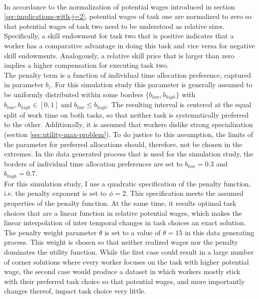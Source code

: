 \documentclass[../main.tex]{subfiles}
\begin{document}
\\
In accordance to the normalization of potential wages introduced in section \ref{sec:implications-with-j=2}, potential wages of task one are normalized to zero so that potential wages of task two need to be understood as relative sizes. Specifically, a skill endowment for task two that is positive indicates that a worker has a comparative advantage in doing this task and vice versa for negative skill endowments. Analogously, a relative skill price that is larger than zero implies a higher compensation for executing task two.
\\
The penalty term is a function of individual time allocation preference, captured in parameter $b_i$. For this simulation study this parameter is generally assumed to be uniformly distributed within some borders $\{b_{low}, b_{high}\}$ with $b_{low}, b_{high} \in [0, 1] \; \text{and} \; b_{low} \leq b_{high}$. The resulting interval is centered at the equal split of work time on both tasks, so that neither task is systematically preferred to the other. Additionally, it is assumed that workers dislike strong specialization (section \ref{sec:utility-max-problem}). To do justice to this assumption, the limits of the parameter for preferred allocations should, therefore, not be chosen in the extremes. In the data generated process that is used for the simulation study, the borders of individual time allocation preferences are set to $b_{low} = 0.3$ and $b_{high} = 0.7$.
\\
For this simulation study, I use a quadratic specification of the penalty function, i.e. the penalty exponent is set to $\phi = 2$. This specification meets  the assumed properties of the penalty function. 
At the same time, it results optimal task choices that are a linear function in relative potential wages, which makes the linear interpolation of inter temporal changes in task choices an exact solution. The penalty weight parameter $\theta$ is set to a value of $\theta = 15$ in this data generating process. This weight is chosen so that neither realized wages nor the penalty dominates the utility function.
While the first case could result in a large number of corner solutions where every worker focuses on the task with higher potential wage, the second case would produce a dataset in which workers mostly stick with their preferred task choice so that potential wages, and more importantly changes thereof, impact task choice very little.
\end{document}
